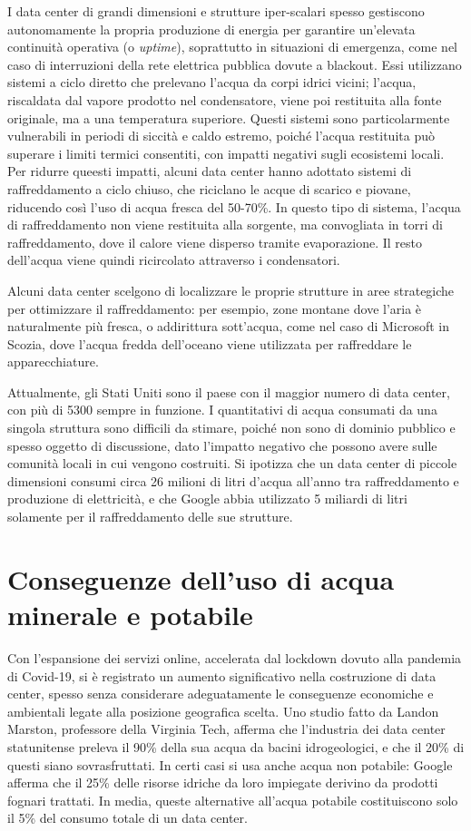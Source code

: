 \documentclass[12pt,a4paper,oneside]{book}
\begin{document}
I data center di grandi dimensioni e strutture iper-scalari spesso gestiscono autonomamente la propria produzione di energia per garantire un'elevata continuità operativa (o \textit{uptime}), soprattutto in situazioni di emergenza, come nel caso di interruzioni della rete elettrica pubblica dovute a blackout.
Essi utilizzano sistemi a ciclo diretto che prelevano l'acqua da corpi idrici vicini; l'acqua, riscaldata dal vapore prodotto nel condensatore, viene poi restituita alla fonte originale, ma a una temperatura superiore. Questi sistemi sono particolarmente vulnerabili in periodi di siccità e caldo estremo, poiché l'acqua restituita può superare i limiti termici consentiti, con impatti negativi sugli ecosistemi locali.
Per ridurre queesti impatti, alcuni data center hanno adottato sistemi di raffreddamento a ciclo chiuso, che riciclano le acque di scarico e piovane, riducendo così l'uso di acqua fresca del 50-70\%. In questo tipo di sistema, l'acqua di raffreddamento non viene restituita alla sorgente, ma convogliata in torri di raffreddamento, dove il calore viene disperso tramite evaporazione. Il resto dell'acqua viene quindi ricircolato attraverso i condensatori.

Alcuni data center scelgono di localizzare le proprie strutture in aree strategiche per ottimizzare il raffreddamento: per esempio, zone montane dove l'aria è naturalmente più fresca, o addirittura sott'acqua, come nel caso di Microsoft in Scozia, dove l'acqua fredda dell'oceano viene utilizzata per raffreddare le apparecchiature.

Attualmente, gli Stati Uniti sono il paese con il maggior numero di data center, con più di 5300 sempre in funzione. I quantitativi di acqua consumati da una singola struttura sono difficili da stimare, poiché non sono di dominio pubblico e spesso oggetto di discussione, dato l'impatto negativo che possono avere sulle comunità locali in cui vengono costruiti. Si ipotizza che un data center di piccole dimensioni consumi circa 26 milioni di litri d'acqua all'anno tra raffreddamento e produzione di elettricità, e che Google abbia utilizzato 5 miliardi di litri solamente per il raffreddamento delle sue strutture.

\section{Conseguenze dell'uso di acqua minerale e potabile}

Con l'espansione dei servizi online, accelerata dal lockdown dovuto alla pandemia di Covid-19, si è registrato un aumento significativo nella costruzione di data center, spesso senza considerare adeguatamente le conseguenze economiche e ambientali legate alla posizione geografica scelta.
Uno studio fatto da Landon Marston, professore della Virginia Tech, afferma che l'industria dei data center statunitense preleva il 90\% della sua acqua da bacini idrogeologici, e che il 20\% di questi siano sovrasfruttati. In certi casi si usa anche acqua non potabile: Google afferma che il 25\% delle risorse idriche da loro impiegate derivino da prodotti fognari trattati. In media, queste alternative all'acqua potabile costituiscono solo il 5\% del consumo totale di un data center. 
\end{document}
